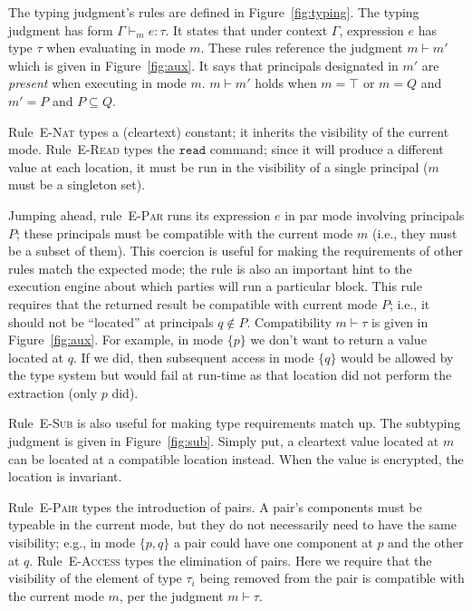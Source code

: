 \documentclass[10pt]{article}
\newcommand{\rulelab}[1]{{\small \textsc{#1}}}
\newcommand{\kw}[1]{\ensuremath{\mathtt{#1}}}
\newcommand{\hastyp}[4]{\ensuremath{{#1} \vdash_{#2} {#3} : {#4}}}
\begin{document}
The typing judgment's rules are defined in Figure~\ref{fig:typing}.
The typing judgment has form $\hastyp{\Gamma}{m}{e}{\tau}$. It states
that under context $\Gamma$, expression $e$ has type $\tau$ when
evaluating in mode $m$. These rules reference the judgment
$m \vdash m'$ which is given in Figure~\ref{fig:aux}. It says that
principals designated in $m'$ are \emph{present} when executing in
mode $m$. $m \vdash m'$ holds when $m = \top$ or $m = Q$ and $m' = P$
and $P \subseteq Q$.

Rule~\rulelab{E-Nat} types a (cleartext) constant; it inherits the
visibility of the current mode. Rule~\rulelab{E-Read} types the
\kw{read} command; since it will produce a different value at each
location, it must be run in the visibility of a single principal ($m$
must be a singleton set).

Jumping ahead, rule~\rulelab{E-Par} runs its expression $e$ in par
mode involving principals $P$; these principals must be compatible
with the current mode $m$ (i.e., they must be a subset of them). This
coercion is useful for making the requirements of other rules match
the expected mode; the rule is also an important hint to the execution
engine about which parties will run a particular block. This rule
requires that the returned result be compatible with current mode $P$;
i.e., it should not be ``located'' at principals $q \not\in P$.
Compatibility $m \vdash \tau$ is given in Figure~\ref{fig:aux}. For
example, in mode $\{p\}$ we don't want to return a value located at
$q$. If we did, then subsequent access in mode $\{q\}$ would be
allowed by the type system but would fail at run-time as that location
did not perform the extraction (only $p$ did).

Rule~\rulelab{E-Sub} is also useful for making type requirements match
up. The subtyping judgment is given in Figure~\ref{fig:sub}. Simply
put, a cleartext value located at $m$ can be located at a compatible
location instead. When the value is encrypted, the location is
invariant. 

Rule~\rulelab{E-Pair} types the introduction of pairs. A pair's
components must be typeable in the current mode, but they do not
necessarily need to have the same visibility; e.g., in mode $\{p,q\}$
a pair could have one component at $p$ and the other at
$q$. Rule~\rulelab{E-Access} types the elimination of pairs. Here we
require that the visibility of the element of type $\tau_i$ being
removed from the pair is compatible with the current mode $m$, per the
judgment $m \vdash \tau$.
\end{document}
